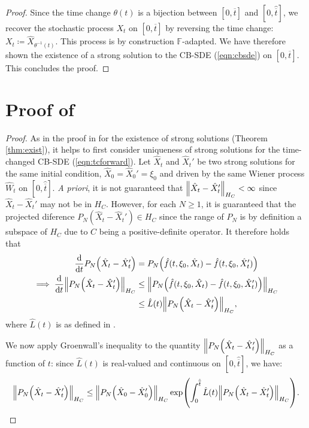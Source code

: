 \begin{proof}
  Since the time change \(\theta(t)\) is a bijection between \([0, \overline{t}]\)  and \([0, \hat{\overline{t}}]\), we recover the stochastic process \(X_{t}\) on \([0, \overline{t}]\) by reversing the time change: \(X_{t} \coloneqq \hat{X}_{\theta^{-1}(t)}\). This process is by construction \(\mathbb{F}\)-adapted. We have therefore shown the existence of a strong solution to the CB-SDE (\ref{eqn:cbsde}) on \([0, \overline{t}]\). This concludes the proof.
\end{proof}

\section{Proof of } \label{prf:thm:uniq}
\restatethmuniq*

\begin{proof}
  As in the proof in  for the existence of strong solutions (Theorem \ref{thm:exist}), it helps to first consider uniqueness of strong solutions for the time-changed CB-SDE (\ref{eqn:tcforward}). Let \(\hat{X}_{t}\) and \(\hat{X}_{t}'\) be two strong solutions for the same initial condition, \(\hat{X}_{0} = \hat{X}_{0}' = \xi_{0}\) and driven by the same Wiener process \(\hat{W}_{t}\) on \([0, \hat{\overline{t}}]\). \textit{A priori}, it is not guaranteed that \(\norm{ \hat{X}_{t} - \hat{X}_{t}'}_{H_{C}} < \infty\) since \(\hat{X}_{t} - \hat{X}_{t}'\) may not be in \(H_{C}\). However, for each \(N \geq 1\), it is guaranteed that the projected diference \(P_{N}( \hat{X}_{t} - \hat{X}_{t}') \in H_{C}\) since the range of \(P_{N}\) is by definition a subspace of \(H_{C}\) due to \(C\) being a positive-definite operator. It therefore holds that
  \begin{align*}
    \dv{t}P_{N}\qty(\hat{X}_{t} - \hat{X}_{t}') &= P_{N}\qty(\hat{f}(t, \xi_{0}, \hat{X}_{t}) - \hat{f}(t, \xi_{0}, \hat{X}_{t}')) \\
    \implies \dv{t} \norm{ P_{N} \qty(\hat{X}_{t} - \hat{X}_{t}')}_{H_{C}} &\leq \norm{P_{N}\qty(\hat{f}(t, \xi_{0}, \hat{X}_{t}) - \hat{f}(t, \xi_{0}, \hat{X}_{t}'))}_{H_{C}} \\
    &\leq \hat{L}(t)\norm{P_{N}\qty( \hat{X}_{t} - \hat{X}_{t}')}_{H_{C}},
  \end{align*}
  where \(\hat{L}(t)\) is as defined in .

  We now apply Groenwall's inequality \citep[][Theorem 1.2.2]{ames1997inequalities} to the quantity \(\norm{P_{N}\qty(\hat{X}_{t} - \hat{X}_{t}')}_{H_{C}}\) as a function of \(t\): since \(\hat{L}(t)\) is real-valued and continuous on \([0, \hat{\overline{t}}]\), we have:
  \[
    \norm{P_{N}\qty( \hat{X}_{t} - \hat{X}_{t}')}_{H_{C}} \leq \norm{ P_{N}\qty( \hat{X}_{0} - \hat{X}_{0}')}_{H_{C}} \exp(\int_{0}^{ \hat{\overline{t}}} \hat{L}(t) \norm{P_{N}\qty( \hat{X}_{t} - \hat{X}_{t}')}_{H_{C}} ).
  \]


\end{proof}

